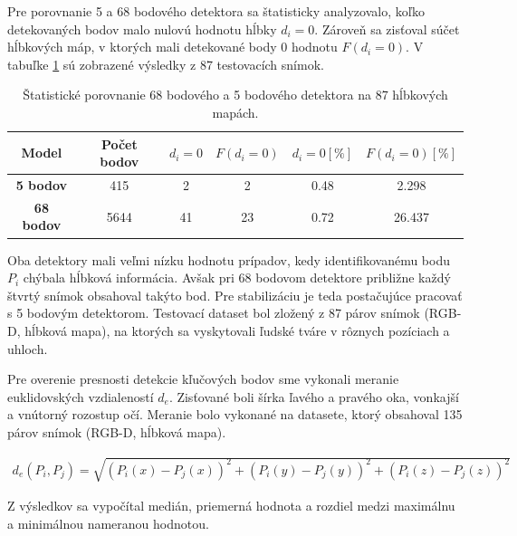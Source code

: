 Pre porovnanie 5 a 68 bodového detektora sa štatisticky analyzovalo, koľko detekovaných bodov malo nulovú hodnotu hĺbky $d_i=0$. Zároveň sa zisťoval súčet hĺbkových máp, v ktorých mali detekované body 0 hodnotu $F(d_i=0)$. V tabuľke \ref{tab:dlib:compare} sú zobrazené výsledky z 87 testovacích snímok.  

\begin{table}[h]
	\caption{\label{tab:dlib:compare} Štatistické porovnanie 68 bodového a 5 bodového detektora na 87 hĺbkových mapách.}
	\centering
	\begin{tabular}{cccccc}
		\toprule
		\textbf{Model} & \textbf{Počet bodov} & \textbf{$d_i=0$} & \textbf{$F(d_i=0)$} & \textbf{$d_i=0 [\%]$ } & \textbf{$F(d_i=0) [\%]$} \\ 
		\midrule
		\textbf{5 bodov} 	& 415 	& 2		& 2		& 0.48	& 2.298 \\
		\textbf{68 bodov} 	& 5644	& 41 	& 23	& 0.72	& 26.437 \\
		\bottomrule
	\end{tabular}
\end{table}

Oba detektory mali veľmi nízku hodnotu prípadov, kedy identifikovanému bodu $P_i$ chýbala hĺbková informácia.  Avšak pri 68 bodovom detektore približne každý štvrtý snímok obsahoval takýto bod. Pre stabilizáciu je teda postačujúce pracovať s 5 bodovým detektorom. Testovací dataset bol zložený z 87 párov snímok (RGB-D, hĺbková mapa), na ktorých sa vyskytovali ľudské tváre v rôznych pozíciach a uhloch. 
 
Pre overenie presnosti detekcie kľučových bodov sme vykonali meranie euklidovských vzdialeností $d_e$. Zisťované boli šírka ľavého a pravého oka, vonkajší a vnútorný rozostup očí. Meranie bolo vykonané na datasete, ktorý obsahoval 135 párov snímok (RGB-D, hĺbková mapa).

\begin{equation}
\label{eq:euclidean}
\begin{aligned}
d_{e}\left(P_i,P_j\right)= \sqrt{\left(P_i(x) - P_j(x)\right)^2 + \left(P_i(y) - P_j(y)\right)^2 + \left(P_i(z) - P_j(z)\right)^2} 
\end{aligned}
\end{equation}

Z výsledkov sa vypočítal medián, priemerná hodnota a rozdiel medzi maximálnu a minimálnou nameranou hodnotou.
 
